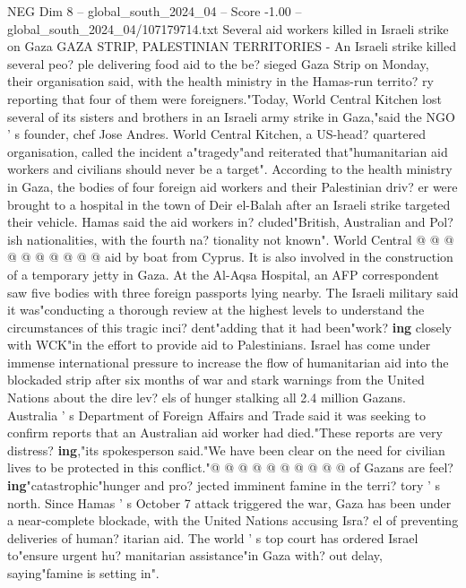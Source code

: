 \begin{textsample}{NEG Dim 8 – global\_south\_2024\_04 – Score -1.00 – global\_south\_2024\_04/107179714.txt}  \label{ex:f8_neg_037}
Several aid workers killed in Israeli strike on Gaza GAZA STRIP, PALESTINIAN TERRITORIES - An Israeli strike killed several peo? ple delivering food aid to the be? sieged Gaza Strip on Monday, their organisation said, with the health ministry in the Hamas-run territo? ry reporting that four of them were foreigners."Today, World Central Kitchen lost several of its sisters and brothers in an Israeli army strike in Gaza,"said the NGO ' s founder, chef Jose Andres.
World Central Kitchen, a US-head? quartered organisation, called the incident a"tragedy"and reiterated that"humanitarian aid workers and civilians should never be a target".
According to the health ministry in Gaza, the bodies of four foreign aid workers and their Palestinian driv? er were brought to a hospital in the town of Deir el-Balah after an Israeli strike targeted their vehicle.
Hamas said the aid workers in? cluded"British, Australian and Pol? ish nationalities, with the fourth na? tionality not known".
World Central @ @ @ @ @ @ @ @ @ @ aid by boat from Cyprus.
It is also involved in the construction of a temporary jetty in Gaza.
At the Al-Aqsa Hospital, an AFP correspondent saw five bodies with three foreign passports lying nearby.
The Israeli military said it was"conducting a thorough review at the highest levels to understand the circumstances of this tragic inci? dent"adding that it had been"work? \textbf{ing} closely with WCK"in the effort to provide aid to Palestinians.
Israel has come under immense international pressure to increase the flow of humanitarian aid into the blockaded strip after six months of war and stark warnings from the United Nations about the dire lev? els of hunger stalking all 2.4 million Gazans.
Australia ' s Department of Foreign Affairs and Trade said it was seeking to confirm reports that an Australian aid worker had died."These reports are very distress? \textbf{ing},"its spokesperson said."We have been clear on the need for civilian lives to be protected in this conflict."@ @ @ @ @ @ @ @ @ @ of Gazans are feel? \textbf{ing}"catastrophic"hunger and pro? jected imminent famine in the terri? tory ' s north.
Since Hamas ' s October 7 attack triggered the war, Gaza has been under a near-complete blockade, with the United Nations accusing Isra? el of preventing deliveries of human? itarian aid.
The world ' s top court has ordered Israel to"ensure urgent hu? manitarian assistance"in Gaza with? out delay, saying"famine is setting in".

\end{textsample}
